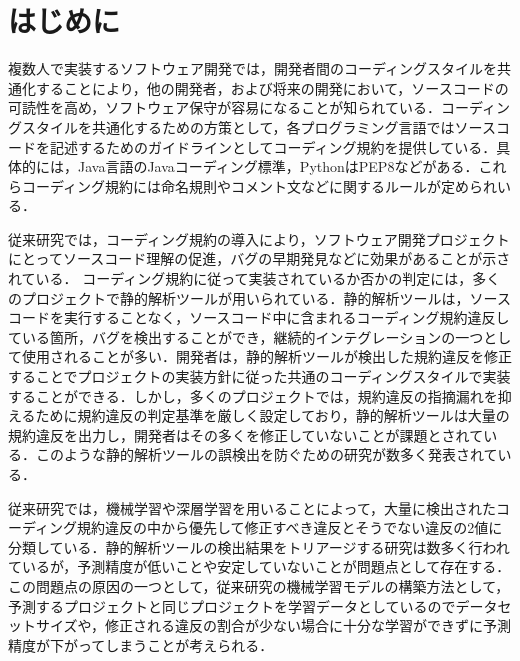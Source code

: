 \documentclass[T,J]{fose} %
\newcommand{\todo}[1]{\colorbox{yellow}{{\bf TODO}:}{\color{red} {\textbf{[#1]}}}}
\begin{document}
\section{はじめに}

複数人で実装するソフトウェア開発では，開発者間のコーディングスタイルを共通化することにより，他の開発者，および将来の開発において，ソースコードの可読性を高め，ソフトウェア保守が容易になることが知られている\cite{EffectsSAT}．コーディングスタイルを共通化するための方策として，各プログラミング言語ではソースコードを記述するためのガイドラインとしてコーディング規約を提供している．具体的には，Java言語のJavaコーディング標準，PythonはPEP8などがある．これらコーディング規約には命名規則やコメント文などに関するルールが定められいる．

従来研究では，コーディング規約の導入により，ソフトウェア開発プロジェクトにとってソースコード理解の促進，バグの早期発見などに効果があることが示されている．
コーディング規約に従って実装されているか否かの判定には，多くのプロジェクトで静的解析ツールが用いられている．静的解析ツールは，ソースコードを実行することなく，ソースコード中に含まれるコーディング規約違反している箇所，バグを検出することができ，継続的インテグレーションの一つとして使用されることが多い．開発者は，静的解析ツールが検出した規約違反を修正することでプロジェクトの実装方針に従った共通のコーディングスタイルで実装することができる．しかし，多くのプロジェクトでは，規約違反の指摘漏れを抑えるために規約違反の判定基準を厳しく設定しており，静的解析ツールは大量の規約違反を出力し，開発者はその多くを修正していないことが課題とされている．このような静的解析ツールの誤検出を防ぐための研究が数多く発表されている．

従来研究では，機械学習や深層学習を用いることによって，大量に検出されたコーディング規約違反の中から優先して修正すべき違反とそうでない違反の2値に分類している．静的解析ツールの検出結果をトリアージする研究は数多く行われているが，予測精度が低いことや安定していないことが問題点として存在する．この問題点の原因の一つとして，従来研究の機械学習モデルの構築方法として，予測するプロジェクトと同じプロジェクトを学習データとしているのでデータセットサイズや，修正される違反の割合が少ない場合に十分な学習ができずに予測精度が下がってしまうことが考えられる．
\end{document}
